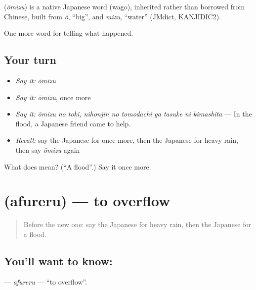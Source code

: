 \begin{cousinweb}
\textbf{} (\emph{ōmizu}) is a native Japanese word (wago), inherited rather than borrowed from Chinese, built from \emph{ō}, \textquotedblleft{}big\textquotedblright{}, and \emph{mizu}, \textquotedblleft{}water\textquotedblright{} (JMdict, KANJIDIC2).
\end{cousinweb}

\begin{grammarlens}[title={What you've built}]
One more word for telling what happened.
\end{grammarlens}

\subsection*{Your turn}
\begin{itemize}
\raggedright
  \item \emph{Say it:} \emph{ōmizu}
  \item \emph{Say it:} \emph{ōmizu}, once more
  \item \emph{Say it:} \emph{ōmizu no toki, nihonjin no tomodachi ga tasuke ni kimashita} — In the flood, a Japanese friend came to help.
  \item \emph{Recall:} say the Japanese for once more, then the Japanese for heavy rain, then say \emph{ōmizu} again
\end{itemize}

\begin{tcolorbox}[breakable,colback=teal!4,colframe=teal!35!black,title={Before you move on}]
What does  mean? (\textquotedblleft{}A flood\textquotedblright{}.) Say it once more.
\end{tcolorbox}
\section[\texorpdfstring{\ja{あふれる} (afureru)}{あふれる (afureru)}]{ (afureru) — to overflow}

\label{lesson:JA-C276-afureru}



\begin{quote}
Before the new one: say the Japanese for heavy rain, then the Japanese for a flood.
\end{quote}

\subsection*{You'll want to know: }
\textbf{} — \emph{afureru} — \textquotedblleft{}to overflow\textquotedblright{}.

